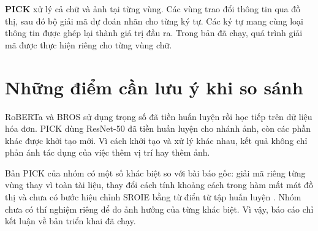 \textbf{PICK} xử lý cả chữ và ảnh tại từng vùng. Các vùng trao đổi thông tin qua đồ thị, sau đó bộ giải mã dự đoán nhãn cho từng ký tự. Các ký tự mang cùng loại thông tin được ghép lại thành giá trị đầu ra. Trong bản đã chạy, quá trình giải mã được thực hiện riêng cho từng vùng chữ.

\section{Những điểm cần lưu ý khi so sánh}
RoBERTa và BROS sử dụng trọng số đã tiền huấn luyện rồi học tiếp trên dữ liệu hóa đơn. PICK dùng ResNet-50 đã tiền huấn luyện cho nhánh ảnh, còn các phần khác được khởi tạo mới. Vì cách khởi tạo và xử lý khác nhau, kết quả không chỉ phản ánh tác dụng của việc thêm vị trí hay thêm ảnh.

Bản PICK của nhóm có một số khác biệt so với bài báo gốc: giải mã riêng từng vùng thay vì toàn tài liệu, thay đổi cách tính khoảng cách trong hàm mất mát đồ thị và chưa có bước hiệu chỉnh SROIE bằng từ điển từ tập huấn luyện \parencite{yu2020}. Nhóm chưa có thí nghiệm riêng để đo ảnh hưởng của từng khác biệt. Vì vậy, báo cáo chỉ kết luận về bản triển khai đã chạy.
